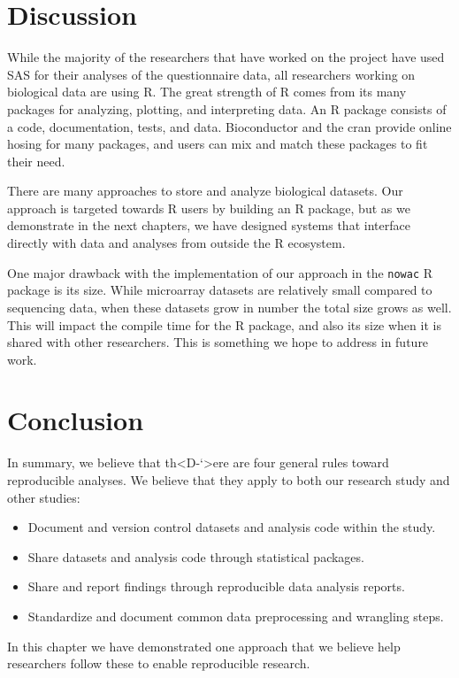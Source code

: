 \section{Discussion}
While the majority of the researchers that have worked on the project have used
SAS for their analyses of the questionnaire data, all researchers working on
biological data are using R.  The great strength of R comes from its many
packages for analyzing, plotting, and interpreting data. An R package consists
of a code, documentation, tests, and data.  Bioconductor\cite{bioconductor} and
the \gls{cran}\cite{cran} provide online hosing for many packages, and users can
mix and match these packages to fit their need. 

There are many approaches to store and analyze biological datasets. Our approach
is targeted towards R users by building an R package, but as we demonstrate in
the next chapters, we have designed systems that interface directly with data
and analyses from outside the R ecosystem. 

One major drawback with the implementation of our approach in the \texttt{nowac}
R package is its size. While microarray datasets are relatively small compared
to sequencing data, when these datasets grow in number the total size grows as
well. This will impact the compile time for the R package, and also its size
when it is shared with other researchers. This is something we hope to address
in future work. 


\section{Conclusion}
In summary, we believe that th<D-`>ere are four general rules toward reproducible
analyses. We believe that they apply to both our research study and other
studies:
\begin{itemize} 
    \item Document and version control datasets and analysis code within the
        study. 
    \item Share datasets and analysis code through statistical packages. 
    \item Share and report findings through reproducible data analysis reports. 
    \item Standardize and document common data preprocessing and wrangling
        steps.
\end{itemize} 

In this chapter we have demonstrated one approach that we believe help
researchers follow these to enable reproducible research. 

